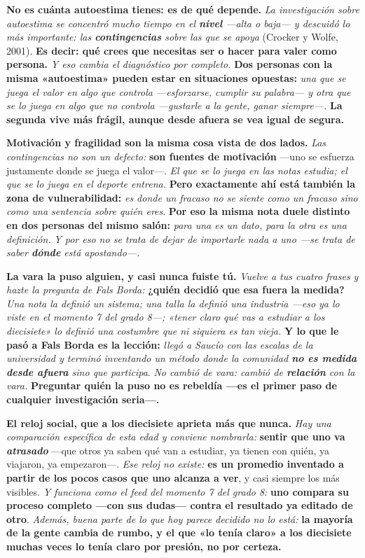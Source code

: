 \documentclass[11pt,letterpaper]{article}
\newcommand{\milcpaso}[3]{%
\Needspace{4\baselineskip}%
\begin{tcolorbox}[enhanced,colback=white,colframe=milcLinea,arc=1.5mm,boxrule=.9pt,
  left=14mm,right=4mm,top=3mm,bottom=3mm,before skip=4pt,after skip=4pt,
  fontupper=\RaggedRight,
  overlay={\node[anchor=north west,circle,fill=#2,text=white,inner sep=0pt,
    minimum size=7.4mm,font=\sffamily\bfseries\small]
    at ([xshift=3.6mm,yshift=-3.2mm]frame.north west) {#1};}]
#3
\end{tcolorbox}}
\begin{document}
\milcpaso{1}{milcTurquesa}{\textbf{No es cuánta autoestima tienes: es de qué depende.} \emph{La investigación sobre autoestima se concentró mucho tiempo en el \textbf{nivel} ---alta o baja--- y descuidó lo más importante: las \textbf{contingencias} sobre las que se apoya} (Crocker y Wolfe, 2001). \textbf{Es decir: qué crees que necesitas ser o hacer para valer como persona.} \emph{Y eso cambia el diagnóstico por completo.} \textbf{Dos personas con la misma «autoestima» pueden estar en situaciones opuestas:} \emph{una que se juega el valor en algo que controla ---esforzarse, cumplir su palabra--- y otra que se lo juega en algo que no controla ---gustarle a la gente, ganar siempre---.} \textbf{La segunda vive más frágil, aunque desde afuera se vea igual de segura.}}
\milcpaso{2}{milcTurquesa}{\textbf{Motivación y fragilidad son la misma cosa vista de dos lados.} \emph{Las contingencias no son un defecto:} \textbf{son fuentes de motivación} ---uno se esfuerza justamente donde se juega el valor---. \emph{El que se lo juega en las notas estudia; el que se lo juega en el deporte entrena.} \textbf{Pero exactamente ahí está también la \textbf{zona de vulnerabilidad}:} \emph{es donde un fracaso no se siente como un fracaso sino como una sentencia sobre quién eres}. \textbf{Por eso la misma nota duele distinto en dos personas del mismo salón:} \emph{para una es un dato, para la otra es una definición.} \emph{Y por eso no se trata de dejar de importarle nada a uno ---se trata de saber \textbf{dónde} está apostando---.}}
\milcpaso{3}{milcTurquesa}{\textbf{La vara la puso alguien, y casi nunca fuiste tú.} \emph{Vuelve a tus cuatro frases y hazte la pregunta de Fals Borda:} \textbf{¿quién decidió que esa fuera la medida?} \emph{Una nota la definió un sistema; una talla la definió una industria ---eso ya lo viste en el momento 7 del grado 8---; «tener claro qué vas a estudiar a los diecisiete» lo definió una costumbre que ni siquiera es tan vieja.} \textbf{Y lo que le pasó a Fals Borda es la lección:} \emph{llegó a Saucío con las escalas de la universidad y terminó inventando un método donde la comunidad \textbf{no es medida desde afuera} sino que participa}. \emph{No cambió de vara: cambió de \textbf{relación} con la vara.} \textbf{Preguntar quién la puso no es rebeldía ---es el primer paso de cualquier investigación seria---.}}
\milcpaso{4}{milcTurquesa}{\textbf{El reloj social, que a los diecisiete aprieta más que nunca.} \emph{Hay una comparación específica de esta edad y conviene nombrarla:} \textbf{sentir que uno va \emph{atrasado}} ---que otros ya saben qué van a estudiar, ya tienen con quién, ya viajaron, ya empezaron---. \emph{Ese reloj no existe:} \textbf{es un promedio inventado a partir de los pocos casos que uno alcanza a ver}, y casi siempre los más visibles. \emph{Y funciona como el feed del momento 7 del grado 8:} \textbf{uno compara su proceso completo ---con sus dudas--- contra el resultado ya editado de otro}. \emph{Además, buena parte de lo que hoy parece decidido no lo está:} \textbf{la mayoría de la gente cambia de rumbo, y el que «lo tenía claro» a los diecisiete muchas veces lo tenía claro por presión, no por certeza.}}
\end{document}

